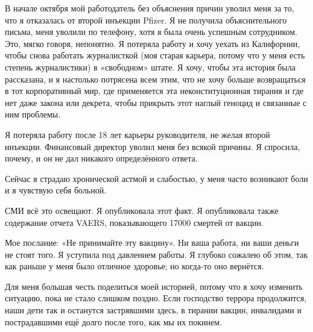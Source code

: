 В начале октября мой работодатель без объяснения причин уволил меня за то, что я
отказалась от второй инъекции Pfizer. Я не получила объяснительного письма, меня
уволили по телефону, хотя я была очень успешным сотрудником. Это, мягко говоря,
непонятно. Я потеряла работу и хочу уехать из Калифорнии, чтобы снова работать
журналисткой (моя старая карьера, потому что у меня есть степень журналистики) в
«свободном» штате. Я хочу, чтобы эта история была рассказана, и я настолько
потрясена всем этим, что не хочу больше возвращаться в тот корпоративный мир,
где применяется эта неконституционная тирания и где нет даже закона или декрета,
чтобы прикрыть этот наглый геноцид и связанные с ним проблемы.

Я потеряла работу после 18 лет карьеры руководителя, не желая второй
инъекции. Финансовый директор уволил меня без всякой причины. Я спросила,
почему, и он не дал никакого определённого ответа.

Сейчас я страдаю хронической астмой и слабостью, у меня часто возникают боли и я
чувствую себя больной.

СМИ всё это освещают. Я опубликовала этот факт. Я опубликовала также содержание
отчета VAERS, показывающего 17000 смертей от вакцин.

Мое послание: «Не принимайте эту вакцину». Ни ваша работа, ни ваши деньги не
стоят того. Я уступила под давлением работы. Я глубоко сожалею об этом, так как
раньше у меня было отличное здоровье; но когда-то оно вернётся.

Для меня большая честь поделиться моей историей, потому что я хочу изменить
ситуацию, пока не стало слишком поздно. Если господство террора продолжится,
наши дети так и останутся застрявшими здесь, в тирании вакцин, инвалидами и
пострадавшими ещё долго после того, как мы их покинем.
